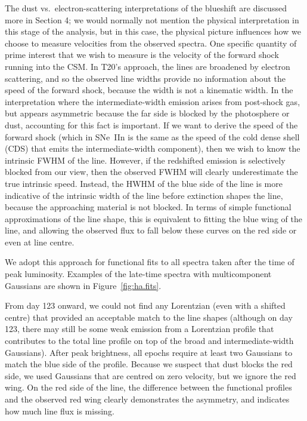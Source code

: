 \documentclass[fleqn,usenatbib,useAMS]{mnras}
\begin{document}
The dust vs.\ electron-scattering interpretations of the blueshift are
discussed more in Section 4; we would normally not mention the
physical interpretation in this stage of the analysis, but in this case,
the physical picture influences how we choose to measure velocities
from the observed spectra.  One specific quantity of prime interest
that we wish to measure is the velocity of the forward shock
running into the CSM.  In T20's approach, the lines are broadened
by electron scattering, and so the observed line widths
provide no information about the speed of the forward shock, because
the width is not a kinematic width.  In the interpretation where the
intermediate-width emission arises from post-shock gas, but appears
asymmetric because the far side is blocked by the photosphere or dust,
 accounting  for this fact is important. If we want to derive
the speed of the forward shock (which in SNe~IIn is the same as the
speed of the cold dense shell (CDS) that emits the intermediate-width component), then we
wish to know the intrinsic FWHM of the line.  However, if the
redshifted emission is selectively blocked from our view, then the
observed FWHM will clearly underestimate the true intrinsic
speed. Instead, the HWHM of the blue side of the line is more
indicative of the intrinsic width of the line before extinction shapes
the line, because the approaching material is not blocked.
In terms of simple functional approximations of the line shape,
this is equivalent to fitting the blue wing of the line, and allowing
the observed flux to fall below these curves on the red side or even
at line centre.

We adopt this approach for functional fits to all spectra taken
after the time of peak luminosity.  Examples of the late-time spectra
with multicomponent Gaussians are shown in Figure~\ref{fig:ha.fits}.

From day 123 onward, we could not find any Lorentzian (even with a
shifted centre) that provided an acceptable match to the line shapes
(although on day 123, there may still be some weak emission from a
Lorentzian profile that contributes to the total line profile on top
of the broad and intermediate-width Gaussians).  After peak brightness, all
epochs require at least two Gaussians to match the blue side of the
profile.  Because we suspect that dust blocks the red side, we used
Gaussians that are centred on zero velocity, but we ignore the red
wing.  On the red side of the line, the difference between the
functional profiles and the observed red wing clearly demonstrates the
asymmetry, and indicates how much line flux is missing.
\end{document}
